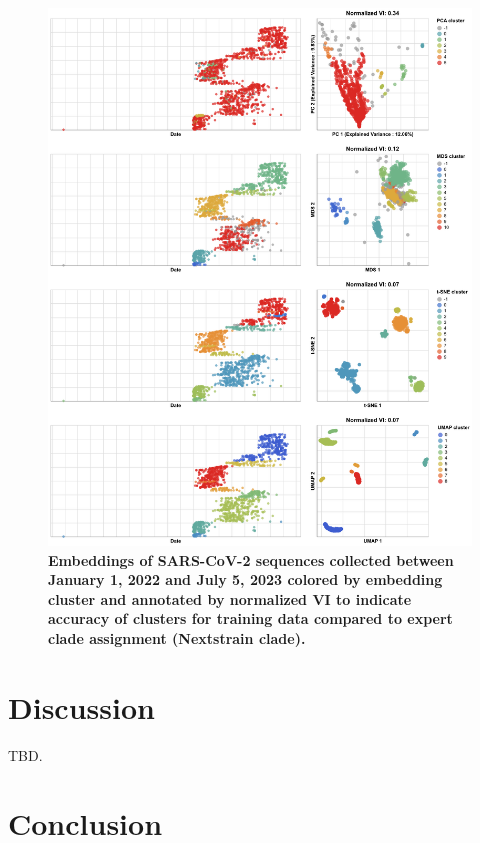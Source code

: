 \documentclass[10pt,letterpaper]{article}
\begin{document}
\begin{figure}[!h]
\includegraphics[width=\columnwidth]{figures/sarscov2-test-embeddings-by-cluster-vs-Nextstrain_clade.png}
\caption{{\bf Embeddings of SARS-CoV-2 sequences collected between January 1, 2022 and July 5, 2023 colored by embedding cluster and annotated by normalized VI to indicate accuracy of clusters for training data compared to expert clade assignment (Nextstrain clade).}
}
\label{fig:sars-cov-2-2022-2023-clusters-vs-Nextstrain-clade}
\end{figure}

\section*{Discussion}

TBD.

\section*{Conclusion}
\end{document}
